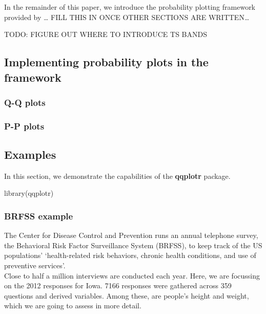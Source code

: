 In the remainder of this paper, we introduce the probability plotting
framework provided by \ldots{} FILL THIS IN ONCE OTHER
SECTIONS ARE WRITTEN\ldots{}

TODO: FIGURE OUT WHERE TO INTRODUCE TS BANDS \citep{Aldor-Noiman2013-xw}

\subsection{\texorpdfstring{Implementing probability plots in the
framework}{Implementing probability plots in the  framework}}\label{implementing-probability-plots-in-the-framework}

\subsubsection{Q-Q plots}\label{q-q-plots}

\subsubsection{P-P plots}\label{p-p-plots}

\subsection{Examples}\label{examples}

In this section, we demonstrate the capabilities of the \textbf{qqplotr}
package.

\begin{Schunk}
\begin{Sinput}
library(qqplotr)
\end{Sinput}
\end{Schunk}

\subsubsection{BRFSS example}\label{brfss-example}

The Center for Disease Control and Prevention runs an annual telephone
survey, the Behavioral Risk Factor Surveillance System (BRFSS), to keep
track of the US populations' `health-related risk behaviors, chronic
health conditions, and use of preventive services'.\\
Close to half a million interviews are conducted each year. Here, we are
focussing on the 2012 responses for Iowa. 7166 responses were gathered
across 359 questions and derived variables. Among these, are people's
height and weight, which we are going to assess in more detail.

